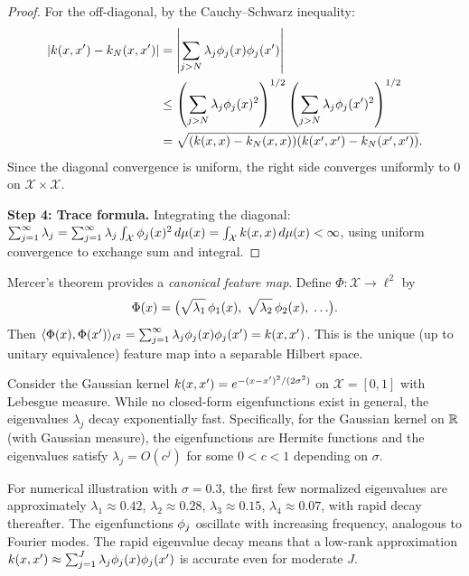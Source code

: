\documentclass[11pt,a4paper]{article}
\begin{document}
\begin{proof}
For the off-diagonal, by the Cauchy--Schwarz inequality:
\begin{align*}
|k(x, x') - k_N(x, x')|
&= \left| \sum_{j > N} \lambda_j \phi_j(x) \phi_j(x')
\right| \\
&\le \left( \sum_{j > N} \lambda_j \phi_j(x)^2 \right)^{1/2}
\left( \sum_{j > N} \lambda_j \phi_j(x')^2 \right)^{1/2} \\
&= \sqrt{(k(x,x) - k_N(x,x))(k(x',x') -
k_N(x',x'))}.
\end{align*}
Since the diagonal convergence is uniform, the right side converges
uniformly to $0$ on $\mathcal{X} \times \mathcal{X}$.

\textbf{Step 4: Trace formula.} Integrating the diagonal:
$\sum_{j=1}^\infty \lambda_j = \sum_{j=1}^\infty \lambda_j
\int_{\mathcal{X}} \phi_j(x)^2 \, d\mu(x) =
\int_{\mathcal{X}} k(x, x) \, d\mu(x) < \infty$,
using uniform convergence to exchange sum and integral.
\end{proof}

\begin{keyresult}[title={Mercer's Canonical Feature Map}]
\label{kr:mercer-feature-map}
Mercer's theorem provides a \emph{canonical feature map}. Define
$\Phi \colon \mathcal{X} \to \ell^2$ by
\[
\Phi(x) = \bigl(\sqrt{\lambda_1}\, \phi_1(x), \;
\sqrt{\lambda_2}\, \phi_2(x), \; \ldots \bigr).
\]
Then $\langle \Phi(x), \Phi(x') \rangle_{\ell^2} =
\sum_{j=1}^\infty \lambda_j \phi_j(x) \phi_j(x')
= k(x, x')$. This is the unique (up to unitary
equivalence) feature map into a separable Hilbert space.
\end{keyresult}

\begin{example}
\label{ex:gaussian-eigenexpansion}
Consider the Gaussian kernel $k(x, x') = e^{-(x-x')^2 /
(2\sigma^2)}$ on $\mathcal{X} = [0,1]$ with Lebesgue measure.
While no closed-form eigenfunctions exist in general, the
eigenvalues $\lambda_j$ decay exponentially fast. Specifically,
for the Gaussian kernel on $\mathbb{R}$ (with Gaussian measure), the
eigenfunctions are Hermite functions and the eigenvalues satisfy
$\lambda_j = O(c^j)$ for some $0 < c < 1$ depending on $\sigma$.

For numerical illustration with $\sigma = 0.3$, the first few
normalized eigenvalues are approximately $\lambda_1 \approx 0.42$,
$\lambda_2 \approx 0.28$, $\lambda_3 \approx 0.15$,
$\lambda_4 \approx 0.07$, with rapid decay thereafter. The
eigenfunctions $\phi_j$ oscillate with increasing frequency,
analogous to Fourier modes. The rapid eigenvalue decay means
that a low-rank approximation $k(x, x') \approx
\sum_{j=1}^J \lambda_j \phi_j(x) \phi_j(x')$ is
accurate even for moderate $J$.
\end{example}
\end{document}
